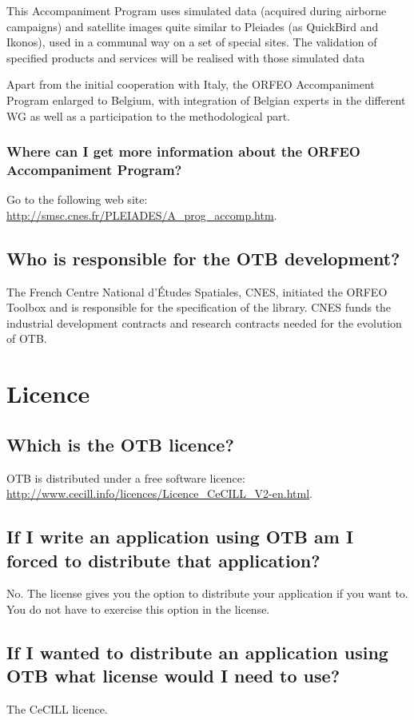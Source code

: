 This Accompaniment Program uses simulated data (acquired during airborne campaigns) and satellite images quite similar to Pleiades (as QuickBird and Ikonos), used in a communal way on a set of special sites. The validation of specified products and services will be realised with those simulated data

Apart from the initial cooperation with Italy, the ORFEO Accompaniment
Program enlarged to Belgium, with integration of Belgian experts in
the different WG as well as a participation to the methodological
part.

\subsubsection{Where can I get more information about the ORFEO
  Accompaniment Program?}
Go to the following web site:
\url{http://smsc.cnes.fr/PLEIADES/A_prog_accomp.htm}.

\subsection{Who is responsible for the OTB development?}
The French Centre National d'\'Etudes Spatiales, CNES, initiated the ORFEO
Toolbox and is responsible for the specification of the library. CNES
funds the industrial development contracts and research contracts
needed for the evolution of OTB.

\section{Licence}
\subsection{Which is the OTB licence?}
OTB is distributed under a free software licence:
\url{http://www.cecill.info/licences/Licence_CeCILL_V2-en.html}.


\subsection{If I write an application using OTB am I forced to distribute that application?}
No. The license gives you the option to distribute your application if
you want to. You do not have to exercise this option in the license.

\subsection{If I wanted to distribute an application using OTB what license would I need to use?}
    The CeCILL licence.

